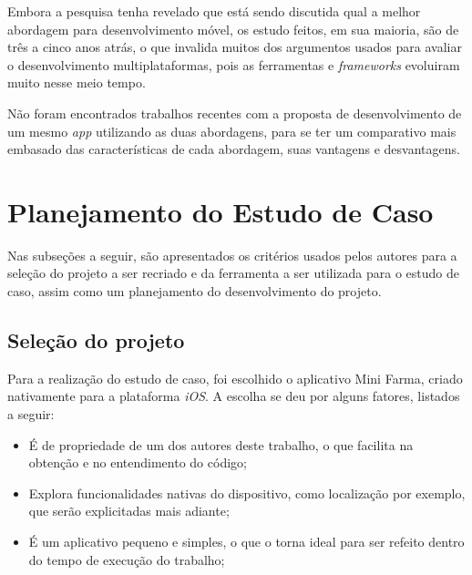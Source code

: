 Embora a pesquisa tenha revelado que está sendo discutida qual a melhor abordagem para desenvolvimento móvel, os estudo feitos, em sua maioria, são de três a cinco 
anos atrás, o que invalida muitos dos argumentos usados para avaliar o desenvolvimento multiplataformas, pois as ferramentas e \textit{frameworks} evoluiram muito nesse
meio tempo. 

Não foram encontrados trabalhos recentes com a proposta de desenvolvimento de um mesmo \textit{app} utilizando as duas abordagens, para se ter um comparativo mais embasado das
características de cada abordagem, suas vantagens e desvantagens.
 
\begin{comment}
Falar que tem mt trabalho comparativo de nativo e cross, mas não refletem a atualidades, pois mudou muito em poucos anos.
e nao ha um estudo comparativo
tenho 3 plataformas, o cross surgiu como uma solucao, e queremos confirmar se eh mesmo uma solucao
da pra confiar nessa abordagem pra todos os desenvolvimentos de apps?    
\end{comment}

\section{Planejamento do Estudo de Caso} \label{section:planejamentoestudodecaso}

Nas subseções a seguir, são apresentados os critérios usados pelos autores para a seleção do projeto a ser recriado e da ferramenta a ser utilizada para o estudo de caso, assim como um planejamento
do desenvolvimento do projeto.

\subsection{Seleção do projeto} \label{subsection:selecaodoprojeto}

Para a realização do estudo de caso, foi escolhido o aplicativo Mini Farma, criado nativamente para a plataforma \textit{iOS}. A escolha se deu por alguns fatores, listados a seguir:

\begin{itemize}
    \item É de propriedade de um dos autores deste trabalho, o que facilita na obtenção e no entendimento do código;
    \item Explora funcionalidades nativas do dispositivo, como localização por exemplo, que serão explicitadas mais adiante;
    \item É um aplicativo pequeno e simples, o que o torna ideal para ser refeito dentro do tempo de execução do trabalho;
\end{itemize}

